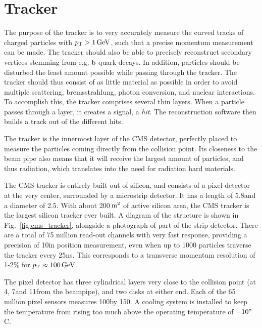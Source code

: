 \section{Tracker \label{sec:cms_tracker}}

The purpose of the tracker is to very accurately measure the curved tracks of charged
particles with $\pt > 1\GeV$, such that a precise momentum measurement can be made. 
The tracker should also be able to precisely reconstruct secondary
vertices stemming from e.g. $\cPqb$ quark decays. 
In addition, particles should be disturbed the least amount possible while passing through the
tracker. The tracker should thus consist of as little material as possible in order to avoid
multiple scattering, bremsstrahlung, photon conversion, and nuclear interactions.
To accomplish this, the tracker comprises several thin layers. When a particle passes
through a layer, it creates a signal, a \textit{hit}. The reconstruction software then builds a
track out of the different hits. 

The tracker is the innermost layer of the CMS detector, perfectly placed to measure the particles
coming directly from the collision point. Its closeness to the beam pipe also means that it will
receive the largest amount of particles, and thus radiation, which translates into the need for
radiation hard materials. 

The CMS tracker is entirely built out of silicon, and consists of a pixel detector at the very
center, surrounded by a microstrip detector. It has a length of 5.8\meter and a diameter of
2.5\meter. With about 200$\meter^\text{2}$ of active silicon area, the CMS tracker is the largest
silicon tracker ever built. A diagram of the structure is shown in
Fig.~\ref{fig:cms_tracker}, alongside a photograph of part of the strip detector. 
There are a total of 75 million read-out channels with very fast response, providing a precision of
10\mum in position measurement, even when up to 1000 particles traverse the tracker every
25\unit{ns}. This corresponds to a transverse momentum resolution of 1-2\% for $\pt \approx
100\GeV$. 

The pixel detector has three cylindrical layers very close to the collision point (at 4\cm, 7\cm and
11\cm from the beampipe), and two disks at either end. Each of the 65 million pixel sensors measures
100\mum by 150\mum. A cooling system is installed to keep the temperature from rising too much
above the operating temperature of $-10\de$C.


